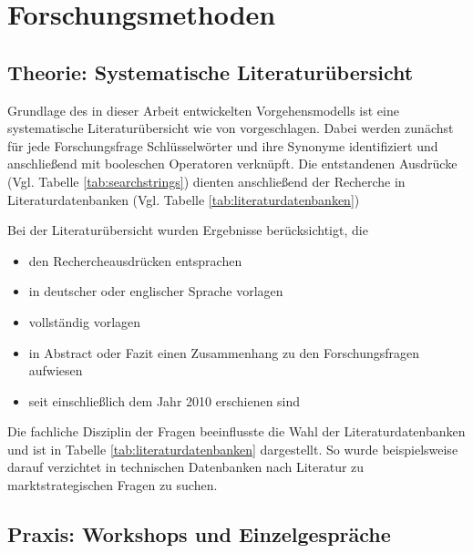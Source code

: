 \section{Forschungsmethoden}

\subsection{Theorie: Systematische Literaturübersicht}
\label{cha:method}
Grundlage des in dieser Arbeit entwickelten Vorgehensmodells ist eine
systematische Literaturübersicht wie von 
vorgeschlagen. Dabei werden zunächst für jede Forschungsfrage Schlüsselwörter
und ihre Synonyme identifiziert und anschließend mit booleschen Operatoren
verknüpft. Die entstandenen Ausdrücke (Vgl. Tabelle
\ref{tab:searchstrings}) dienten anschließend der Recherche in
Literaturdatenbanken (Vgl. Tabelle \ref{tab:literaturdatenbanken})


Bei der Literaturübersicht wurden Ergebnisse berücksichtigt, die
\begin{itemize}
	\item den Rechercheausdrücken entsprachen
	\item in deutscher oder englischer Sprache vorlagen
	\item vollständig vorlagen
	\item in Abstract oder Fazit einen Zusammenhang zu den Forschungsfragen
aufwiesen
	\item seit einschließlich dem Jahr 2010 erschienen sind
\end{itemize}

Die fachliche Disziplin der Fragen beeinflusste die Wahl der
Literaturdatenbanken und ist in Tabelle \ref{tab:literaturdatenbanken}
dargestellt. So wurde beispielsweise darauf verzichtet in technischen
Datenbanken nach Literatur zu marktstrategischen Fragen zu suchen.


\begin{comment}
In diesem Kapitel erläutern Sie ihre Forschungsmethode unter Verwendung von
entsprechenden Quellen.
Begründen Sie auch, warum Sie sich für diese Forschungsmethode entschieden
haben
und warum sie geeignet ist, die vorliegende Forschungsfrage zu beantworten.
\end{comment}

\subsection{Praxis: Workshops und Einzelgespräche}
